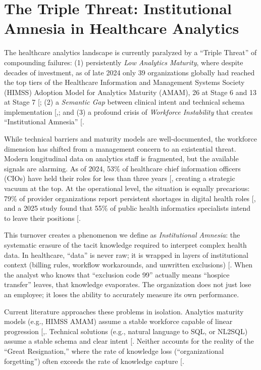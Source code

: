\documentclass[
  american,
  11pt,
  letterpaper,
  oneside  ,captions=tableheading
]{scrartcl}
\begin{document}
\section{The Triple Threat: Institutional Amnesia in Healthcare
Analytics}\label{the-triple-threat-institutional-amnesia-in-healthcare-analytics}

The healthcare analytics landscape is currently paralyzed by a ``Triple
Threat'' of compounding failures: (1) persistently \emph{Low Analytics
Maturity}, where despite decades of investment, as of late 2024 only 39
organizations globally had reached the top tiers of the Healthcare
Information and Management Systems Society (HIMSS) Adoption Model for
Analytics Maturity (AMAM), 26 at Stage 6 and 13 at Stage 7
{[}\citeproc{ref-himss2024}{1}{]}; (2) a \emph{Semantic Gap} between
clinical intent and technical schema implementation
{[},\citeproc{ref-zhang2024}{3}{]}; and (3) a
profound crisis of \emph{Workforce Instability} that creates
``Institutional Amnesia'' {[}\citeproc{ref-hong2025}{4}{]}.

While technical barriers and maturity models are well-documented, the
workforce dimension has shifted from a management concern to an
existential threat. Modern longitudinal data on analytics staff is
fragmented, but the available signals are alarming. As of 2024, 53\% of
healthcare chief information officers (CIOs) have held their roles for
less than three years {[}\citeproc{ref-wittkieffer2024}{5}{]}, creating
a strategic vacuum at the top. At the operational level, the situation
is equally precarious: 79\% of provider organizations report persistent
shortages in digital health roles
{[}\citeproc{ref-himssworkforce2024}{6}{]}, and a 2025 study found that
55\% of public health informatics specialists intend to leave their
positions {[}\citeproc{ref-rajamani2025}{7}{]}.

This turnover creates a phenomenon we define as \emph{Institutional
Amnesia}: the systematic erasure of the tacit knowledge required to
interpret complex health data. In healthcare, ``data'' is never raw; it
is wrapped in layers of institutional context (billing rules, workflow
workarounds, and unwritten exclusions)
{[}\citeproc{ref-american2023}{8}{]}. When the analyst who knows that
``exclusion code 99'' actually means ``hospice transfer'' leaves, that
knowledge evaporates. The organization does not just lose an employee;
it loses the ability to accurately measure its own performance.

Current literature approaches these problems in isolation. Analytics
maturity models (e.g., HIMSS AMAM) assume a stable workforce capable of
linear progression
{[},\citeproc{ref-wang2018}{9}{]}. Technical
solutions (e.g., natural language to SQL, or NL2SQL) assume a stable
schema and clear intent {[}\citeproc{ref-wang2020}{10}{]}. Neither
accounts for the reality of the ``Great Resignation,'' where the rate of
knowledge loss (``organizational forgetting'') often exceeds the rate of
knowledge capture {[}\citeproc{ref-rao2006}{11}{]}.
\end{document}
